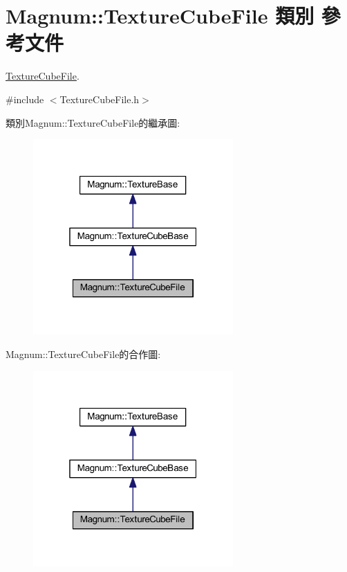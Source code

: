 \hypertarget{class_magnum_1_1_texture_cube_file}{}\section{Magnum\+:\+:Texture\+Cube\+File 類別 參考文件}
\label{class_magnum_1_1_texture_cube_file}


\hyperlink{class_magnum_1_1_texture_cube_file}{Texture\+Cube\+File}.  




{\ttfamily \#include $<$Texture\+Cube\+File.\+h$>$}



類別\+Magnum\+:\+:Texture\+Cube\+File的繼承圖\+:\nopagebreak
\begin{figure}[H]
\begin{center}
\leavevmode
\includegraphics[width=217pt]{class_magnum_1_1_texture_cube_file__inherit__graph}
\end{center}
\end{figure}


Magnum\+:\+:Texture\+Cube\+File的合作圖\+:\nopagebreak
\begin{figure}[H]
\begin{center}
\leavevmode
\includegraphics[width=217pt]{class_magnum_1_1_texture_cube_file__coll__graph}
\end{center}
\end{figure}

